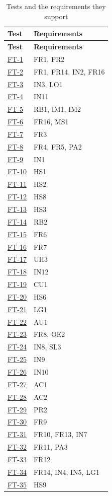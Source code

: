 \documentclass[12pt, titlepage]{article}
\newcommand{\tref}[1]{\hyperlink{test:#1}{#1}}
\begin{document}
\begin{longtable}{@{}P{0.12\textwidth}P{0.84\textwidth}@{}}
\caption{Tests and the requirements they support} \label{TblTrace}\\
\toprule
\textbf{Test} & \textbf{Requirements}\\
\midrule
\endfirsthead
\toprule
\textbf{Test} & \textbf{Requirements}\\
\midrule
\endhead
\tref{FT-1} & FR1, FR2\\
\tref{FT-2} & FR1, FR14, IN2, FR16\\
\tref{FT-3} & IN3, LO1\\
\tref{FT-4} & IN11\\
\tref{FT-5} & RB1, IM1, IM2\\
\tref{FT-6} & FR16, MS1\\
\tref{FT-7} & FR3\\
\tref{FT-8} & FR4, FR5, PA2\\
\tref{FT-9} & IN1\\
\tref{FT-10} & HS1\\
\tref{FT-11} & HS2\\
\tref{FT-12} & HS8\\
\tref{FT-13} & HS3\\
\tref{FT-14} & RB2\\
\tref{FT-15} & FR6\\
\tref{FT-16} & FR7\\
\tref{FT-17} & UH3\\
\tref{FT-18} & IN12\\
\tref{FT-19} & CU1\\
\tref{FT-20} & HS6\\
\tref{FT-21} & LG1\\
\tref{FT-22} & AU1\\
\tref{FT-23} & FR8, OE2\\
\tref{FT-24} & IN8, SL3\\
\tref{FT-25} & IN9\\
\tref{FT-26} & IN10\\
\tref{FT-27} & AC1\\
\tref{FT-28} & AC2\\
\tref{FT-29} & PR2\\
\tref{FT-30} & FR9\\
\tref{FT-31} & FR10, FR13, IN7\\
\tref{FT-32} & FR11, PA3\\
\tref{FT-33} & FR12\\
\tref{FT-34} & FR14, IN4, IN5, LG1\\
\tref{FT-35} & HS9\\

\end{longtable}
\end{document}
